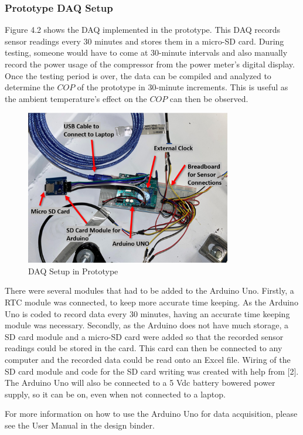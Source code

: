 \subsubsection{Prototype DAQ Setup}
Figure 4.2 shows the DAQ implemented in the prototype. This DAQ records sensor readings every 30 minutes and stores them in a micro-SD card. During testing, someone would have to come at 30-minute intervals and also manually record the power usage of the compressor from the power meter’s digital display. Once the testing period is over, the data can be compiled and analyzed to determine the $COP$ of the prototype in 30-minute increments. This is useful as the ambient temperature’s effect on the $COP$ can then be observed.

\medskip
\begin{figure}[H]
    \centering
    \includegraphics[width=9cm]{images/daq_prototype.png}
    \caption{DAQ Setup in Prototype}
\end{figure}

There were several modules that had to be added to the Arduino Uno. Firstly, a RTC module was connected, to keep more accurate time keeping. As the Arduino Uno is coded to record data every 30 minutes, having an accurate time keeping module was necessary. Secondly, as the Arduino does not have much storage, a SD card module and a micro-SD card were added so that the recorded sensor readings could be stored in the card. This card can then be connected to any computer and the recorded data could be read onto an Excel file. Wiring of the SD card module and code for the SD card writing was created with help from [2]. The Arduino Uno will also be connected to a 5 Vdc battery bowered power supply, so it can be on, even when not connected to a laptop.

\medskip
For more information on how to use the Arduino Uno for data acquisition, please see the User Manual in the design binder. 


